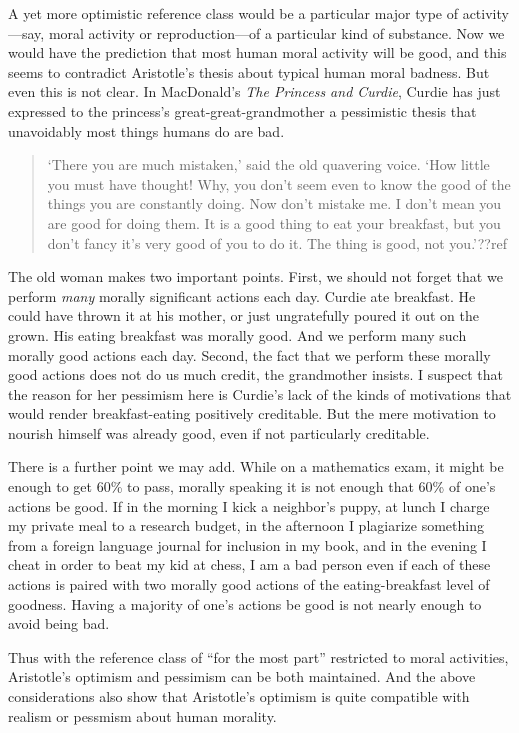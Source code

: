 A yet more optimistic reference class would be a particular major type of activity---say, moral activity or reproduction---of
a particular kind of substance. Now we would have the prediction that most human moral activity will be good, and this seems
to contradict Aristotle's thesis about typical human moral badness. But even this is not clear. In MacDonald's 
\textit{The Princess and Curdie}, Curdie has just expressed to the princess's great-great-grandmother a pessimistic thesis that 
unavoidably most things humans do are bad. 
\begin{quote}
`There you are much mistaken,' said the old quavering voice. `How little you must have thought! Why, you don't seem even to 
know the good of the things you are constantly doing. Now don't mistake me. I don't mean you are good for doing them. 
It is a good thing to eat your breakfast, but you don't fancy it's very good of you to do it. The thing is good, not you.'??ref
\end{quote}
The old woman makes two important points. First, we should not forget that we perform \textit{many} morally significant actions
each day. Curdie ate breakfast. He could have thrown it at his mother, or just ungratefully poured it out on the grown.
His eating breakfast was morally good. And we perform many such morally good actions each day. Second, the fact that we
perform these morally good actions does not do us much credit, the grandmother insists. I suspect that the reason for her
pessimism here is Curdie's lack of the kinds of motivations that would render breakfast-eating positively creditable.
But the mere motivation to nourish himself was already good, even if not particularly creditable.

There is a further point we may add. While on a mathematics exam, it might be enough to get 60\% to pass,
morally speaking it is not enough that 60\% of one's actions be good. If in the morning I kick a neighbor's puppy,
at lunch I charge my private meal to a research budget, in the afternoon I plagiarize something from a foreign
language journal for inclusion in my book, and in the evening I cheat in order to beat my kid at chess, I am a bad
person even if each of these actions is paired with two morally good actions of the eating-breakfast level of 
goodness. Having a majority of one's actions be good is not nearly enough to avoid being bad. 

Thus with the reference class of ``for the most part'' restricted to moral activities, Aristotle's optimism and pessimism
can be both maintained. And the above considerations also show that Aristotle's optimism is quite compatible with 
realism or pessmism about human morality.

